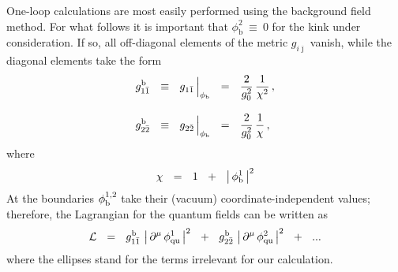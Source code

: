 \documentclass[epsfig,12pt]{article}
\def\beq{\begin{equation}}
\def\eeq{\end{equation}}
\def\beq{\begin{equation}}
\def\eeq{\end{equation}}
\newcommand{\p}{\partial}
\newcommand{\bj}{{\bar \jmath}}
\begin{document}
	One-loop calculations are most easily performed using the background field method.
	For what follows it is important that $ \phi^2_\text{b} ~\equiv~ 0$ for the kink under consideration.
	If so, all off-diagonal elements of the metric $ g_{i\bj} $ vanish, while the diagonal elements take the form
\begin{align}
%
\nonumber
	g_{1\bar 1}^{\rm b} & ~~\equiv~~ g_{1\bar 1}\, \Big|_{\phi_{\rm b}} ~~=~~ \frac{2}{g_0^2}\,\frac {1}{\chi^2}\,,
	\\[3mm]
%
	g_{2\bar 2}^{\rm b} & ~~\equiv~~ 
	g_{2\bar 2}\,\Big|_{\phi_{\rm b}} ~~=~~ \frac{2}{g_0^2}\,\frac {1}{\chi}\,,
\end{align}
where
\beq
	\chi ~~=~~ 1 ~~+~~ \left|\, \phi^1_{\rm b} \,\right|^2
\eeq
	At the boundaries $\phi_{\rm b}^{1,2}$ take their (vacuum) coordinate-independent values;
	therefore, the Lagrangian for the quantum fields can be written as
\beq
	\mathcal{L}  ~~=~~  g_{1\bar 1}^{\rm b}\, \left|\, \p^\mu\, \phi^1_{\rm qu} \,\right|^2  ~~+~~
			g_{2\bar 2}^{\rm b}\, \left|\, \p^\mu\, \phi^2_{\rm qu} \,\right|^2  ~~+~~ ...
\label{324}
\eeq
	where the ellipses stand for the terms irrelevant for our calculation.
\end{document}
